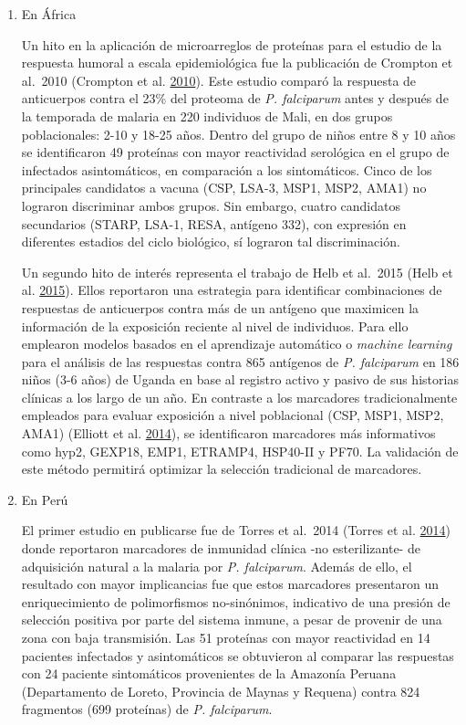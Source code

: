 \documentclass[
  a4paper]{article}
\begin{document}
\begin{enumerate}
\def\labelenumi{\alph{enumi}.}
\item
  En África

  Un hito en la aplicación de microarreglos de proteínas para el estudio
  de la respuesta humoral a escala epidemiológica fue la publicación de
  Crompton et al.~2010 (Crompton et al.
  \protect\hyperlink{ref-crompton2010}{2010}). Este estudio comparó la
  respuesta de anticuerpos contra el 23\% del proteoma de \emph{P.
  falciparum} antes y después de la temporada de malaria en 220
  individuos de Mali, en dos grupos poblacionales: 2-10 y 18-25 años.
  Dentro del grupo de niños entre 8 y 10 años se identificaron 49
  proteínas con mayor reactividad serológica en el grupo de infectados
  asintomáticos, en comparación a los sintomáticos. Cinco de los
  principales candidatos a vacuna (CSP, LSA-3, MSP1, MSP2, AMA1) no
  lograron discriminar ambos grupos. Sin embargo, cuatro candidatos
  secundarios (STARP, LSA-1, RESA, antígeno 332), con expresión en
  diferentes estadios del ciclo biológico, sí lograron tal
  discriminación.

  Un segundo hito de interés representa el trabajo de Helb et al.~2015
  (Helb et al. \protect\hyperlink{ref-Helb2015exposure}{2015}). Ellos
  reportaron una estrategia para identificar combinaciones de respuestas
  de anticuerpos contra más de un antígeno que maximicen la información
  de la exposición reciente al nivel de individuos. Para ello emplearon
  modelos basados en el aprendizaje automático o \emph{machine learning}
  para el análisis de las respuestas contra 865 antígenos de \emph{P.
  falciparum} en 186 niños (3-6 años) de Uganda en base al registro
  activo y pasivo de sus historias clínicas a los largo de un año. En
  contraste a los marcadores tradicionalmente empleados para evaluar
  exposición a nivel poblacional (CSP, MSP1, MSP2, AMA1) (Elliott et al.
  \protect\hyperlink{ref-elliott2014}{2014}), se identificaron
  marcadores más informativos como hyp2, GEXP18, EMP1, ETRAMP4, HSP40-II
  y PF70. La validación de este método permitirá optimizar la selección
  tradicional de marcadores. 
\item
  En Perú

  El primer estudio en publicarse fue de Torres et al.~2014 (Torres et
  al. \protect\hyperlink{ref-Torres2014asymptomatic}{2014}) donde
  reportaron marcadores de inmunidad clínica -no esterilizante- de
  adquisición natural a la malaria por \emph{P. falciparum}. Además de
  ello, el resultado con mayor implicancias fue que estos marcadores
  presentaron un enriquecimiento de polimorfismos no-sinónimos,
  indicativo de una presión de selección positiva por parte del sistema
  inmune, a pesar de provenir de una zona con baja transmisión. Las 51
  proteínas con mayor reactividad en 14 pacientes infectados y
  asintomáticos se obtuvieron al comparar las respuestas con 24 paciente
  sintomáticos provenientes de la Amazonía Peruana (Departamento de
  Loreto, Provincia de Maynas y Requena) contra 824 fragmentos (699
  proteínas) de \emph{P. falciparum}.


\end{enumerate}
\end{document}

